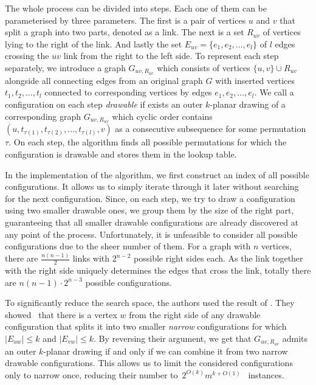 The whole process can be divided into steps. Each one of them can be parameterised by three parameters. The first is a pair of vertices \(u\) and \(v\) that split a graph into two parts, denoted as a link. The next is a set \(R_{uv}\) of vertices lying to the right of the link. And lastly the set \(E_{uv} = \{e_1, e_2, \dots, e_l\}\) of \(l\) edges crossing the \(uv\) link from the right to the left side. To represent each step separately, we introduce a graph \(G_{uv, R_{uv}}\) which consists of vertices \(\{u, v\} \cup R_{uv}\) alongside all connecting edges from an original graph \(G\) with inserted vertices \(t_1, t_2, \dots, t_l\) connected to corresponding vertices by edges \(e_1, e_2, \dots, e_l\). We call a configuration on each step \emph{drawable} if exists an outer \(k\)-planar drawing of a corresponding graph \(G_{uv, R_{uv}}\) which cyclic order contains \((u, t_{\tau(1)}, t_{\tau(2)}, \dots, t_{\tau(l)}, v)\) as a consecutive subsequence for some permutation \(\tau\). On each step, the algorithm finds all possible permutations for which the configuration is drawable and stores them in the lookup table.

In the implementation of the algorithm, we first construct an index of all possible configurations. It allows us to simply iterate through it later without searching for the next configuration. Since, on each step, we try to draw a configuration using two smaller drawable ones, we group them by the size of the right part, guaranteeing that all smaller drawable configurations are already discovered at any point of the process. Unfortunately, it is unfeasible to consider all possible configurations due to the sheer number of them. For a graph with \(n\) vertices, there are \(\frac{n(n-1)}{2}\) links with \(2^{n-2}\) possible right sides each. As the link together with the right side uniquely determines the edges that cross the link, totally there are \(n(n-1)\cdot2^{n-3}\) possible configurations.

To significantly reduce the search space, the authors used the result of \citeauthor{triangulations}. They showed~\cite{triangulations} that there is a vertex \(w\) from the right side of any drawable configuration that splits it into two smaller \emph{narrow} configurations for which \(|E_{uw}| \leqslant k\) and \(|E_{vw}| \leqslant k\). By reversing their argument, we get that \(G_{uv, R_{uv}}\) admits an outer \(k\)-planar drawing if and only if we can combine it from two narrow drawable configurations. This allows us to limit the considered configurations only to narrow once, reducing their number to~\(2^{O(k)}m^{k+O(1)}\)~\cite[Lemma 15]{okp} instances.

